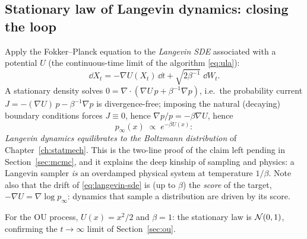 \subsection{Stationary law of Langevin dynamics: closing the loop}

Apply the Fokker--Planck equation to the \emph{Langevin SDE} associated
with a potential $U$ (the continuous-time limit of the algorithm
\eqref{eq:ula}):
\begin{equation}
  \dd X_t = -\nabla U(X_t)\,\dd t + \sqrt{2\beta^{-1}}\;\dd W_t .
  \label{eq:langevin-sde}
\end{equation}
A stationary density solves
$0 = \nabla \cdot ( \nabla U\, p + \beta^{-1} \nabla p )$, i.e.\ the
probability current $J = -(\nabla U)\,p - \beta^{-1}\nabla p$ is
divergence-free; imposing the natural (decaying) boundary conditions
forces $J \equiv 0$, hence $\nabla p / p = -\beta \nabla U$, hence
\begin{equation}
  p_\infty(x) \;\propto\; e^{-\beta U(x)} :
  \label{eq:langevin-boltzmann}
\end{equation}
\emph{Langevin dynamics equilibrates to the Boltzmann distribution} of
Chapter~\ref{ch:statmech}. This is the two-line proof of the claim left
pending in Section~\ref{sec:mcmc}, and it explains the deep kinship of
sampling and physics: a Langevin sampler \emph{is} an overdamped physical
system at temperature $1/\beta$. Note also that the drift of
\eqref{eq:langevin-sde} is (up to $\beta$) the \emph{score} of the
target, $-\nabla U = \nabla \log p_\infty$: dynamics that sample a
distribution are driven by its score.

For the OU process, $U(x) = x^2/2$ and $\beta = 1$: the stationary law is
$\mathcal{N}(0,1)$, confirming the $t \to \infty$ limit of Section~\ref{sec:ou}.

